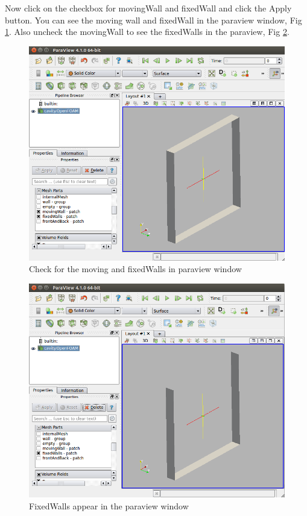\documentclass[a4paper,12pt]{report}
\begin{document}
\vspace{1.5cm}
\flushleft Now click on the checkbox for movingWall and fixedWall and click the Apply button. You can see the moving wall and fixedWall in the paraview window, Fig \ref{part2}. Also uncheck the movingWall to see the fixedWalls in the paraview, Fig \ref{part3}.

\begin{figure}[ht]  
\begin{center}  
\includegraphics[scale=0.32]{part2.png}
\caption{Check for the moving and fixedWalls in paraview window}
\label{part2}
\end{center}  
\end{figure}

\begin{figure}[ht]  
\begin{center}  
\includegraphics[scale=0.32]{part3.png}
\caption{FixedWalls appear in the paraview window}
\label{part3}
\end{center}  
\end{figure}
\end{document}
